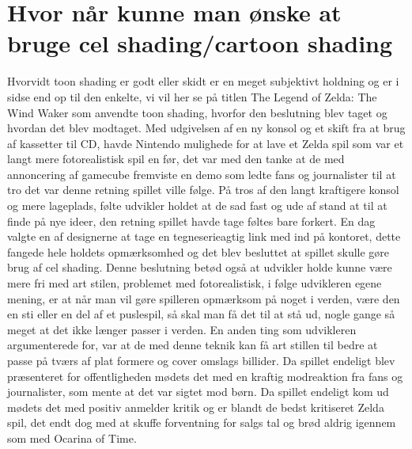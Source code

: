 \newpage
\section{Hvor når kunne man ønske at bruge cel shading/cartoon shading}

Hvorvidt toon shading er godt eller skidt er en meget subjektivt holdning og er i sidse end op til den enkelte, vi vil her se på titlen The Legend of Zelda: The Wind Waker som anvendte toon shading, hvorfor den beslutning blev taget og hvordan det blev modtaget. Med udgivelsen af en ny konsol og et skift fra at brug af kassetter til CD, havde Nintendo mulighede for at lave et Zelda spil som var et langt mere fotorealistisk spil en før, det var med den tanke at de med annoncering af gamecube fremviste en demo \cite{Zelda} som ledte fans og journalister til at tro det var denne retning spillet ville følge. På tros af den langt kraftigere konsol og mere lageplads, følte udvikler holdet at de sad fast og ude af stand at til at finde på nye \cite{Zelda}ideer, den retning spillet havde tage føltes bare forkert. En dag valgte en af designerne at tage en  tegneserieagtig \cite{ToonLinkIsBorn}link med ind på kontoret, dette fangede hele holdets opmærksomhed og det blev besluttet at spillet skulle gøre brug af cel shading. Denne beslutning betød også at udvikler holde kunne være mere fri med art stilen, problemet med fotorealistisk, i følge udvikleren egene mening, er at når man vil gøre spilleren opmærksom på noget i verden, være den en sti eller en del af et puslespil, så skal man få det til at stå ud, nogle gange så meget at det ikke længer passer i verden. En anden ting som udvikleren argumenterede for, var at de med denne teknik kan få art stillen til bedre at passe på tværs af plat formere og cover omslags 
\cite{nintendo}billider. Da spillet endeligt blev præsenteret for offentligheden mødets det med en kraftig modreaktion fra fans og journalister, som mente at det var sigtet mod \cite{nintendo}børn. Da spillet endeligt kom ud mødets det med positiv \cite{BigScore}anmelder kritik og er blandt de bedst kritiseret Zelda spil, det endt dog med at skuffe forventning for salgs tal og brød aldrig igennem som med Ocarina of Time.